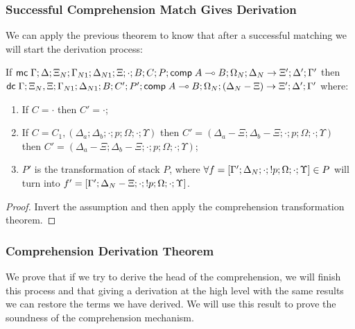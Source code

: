 \subsubsection{Successful Comprehension Match Gives Derivation}

We can apply the previous theorem to know that after a successful matching we will start the derivation process:

\begin{lemma}
   If $\mathsf{mc} \; \Gamma; \Delta; \Xi_N; \Gamma_{N1}; \Delta_{N1}; \Xi; \cdot; B; C; P; \mathsf{comp} \; A \multimap B;\Omega_N; \Delta_N \rightarrow \Xi'; \Delta'; \Gamma'$ then \\
      $\mathsf{dc} \; \Gamma; \Xi_N, \Xi; \Gamma_{N1}; \Delta_{N1}; B; C'; P'; \mathsf{comp} \; A \multimap B; \Omega_N; (\Delta_N - \Xi) \rightarrow \Xi'; \Delta'; \Gamma'$ where:
   
   \begin{enumerate}
      \item If $C = \cdot$ then $C' = \cdot$;
      \item If $C = C_1, (\Delta_a; \Delta_b; \cdot; p; \Omega; \cdot; \Upsilon)$ then $C' = (\Delta_a - \Xi; \Delta_b - \Xi; \cdot; p; \Omega; \cdot; \Upsilon)$ then $C' = (\Delta_a - \Xi; \Delta_b - \Xi; \cdot; p; \Omega; \cdot; \Upsilon)$;
      \item $P'$ is the transformation of stack $P$, where $\forall f = [\Gamma'; \Delta_N; \cdot; {!} p; \Omega; \cdot; \Upsilon] \in P$ will turn into $f' = [\Gamma'; \Delta_N - \Xi; \cdot; {!} p; \Omega; \cdot; \Upsilon]$.
   \end{enumerate}
\end{lemma}

\begin{proof}
   Invert the assumption and then apply the comprehension transformation theorem.
\end{proof}

\subsubsection{Comprehension Derivation Theorem}

We prove that if we try to derive the head of the comprehension, we will finish this process and that giving a derivation at the high level with the same results we can restore the terms we have derived. We will use this result to prove the soundness of the comprehension mechanism.

